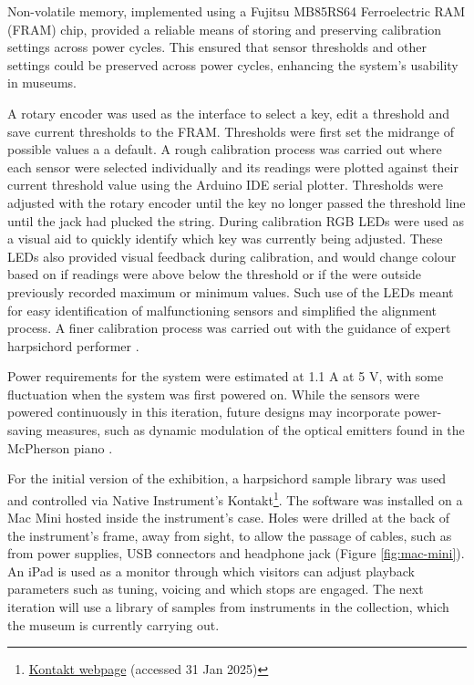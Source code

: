 Non-volatile memory, implemented using a Fujitsu MB85RS64 Ferroelectric RAM (FRAM) chip, provided a reliable means of storing and preserving calibration settings across power cycles. This ensured that sensor thresholds and other settings could be preserved across power cycles, enhancing the system's usability in museums.  

A rotary encoder was used as the interface to select a key, edit a threshold and save current thresholds to the FRAM.
Thresholds were first set the midrange of possible values a a default. A rough calibration process was carried out where each sensor were selected individually and its readings were plotted against their current threshold value using the Arduino IDE serial plotter. Thresholds were adjusted with the rotary encoder until the key no longer passed the threshold line until the jack had plucked the string. During calibration RGB LEDs were used as a visual aid to quickly identify which key was currently being adjusted. These LEDs also provided visual feedback during calibration, and would change colour based on if readings were above below the threshold or if the were outside previously recorded maximum or minimum values. Such use of the LEDs meant for easy identification of malfunctioning sensors and simplified the alignment process. A finer calibration process was carried out with the guidance of expert harpsichord performer .

Power requirements for the system were estimated at 1.1 A at 5 V, with some fluctuation when the system was first powered on. While the sensors were powered continuously in this iteration, future designs may incorporate power-saving measures, such as dynamic modulation of the optical emitters found in the McPherson piano \cite{McPherson2013}.

For the initial version of the exhibition, a harpsichord sample library was used and controlled via Native Instrument's Kontakt\footnote{\href{https://www.native-instruments.com/en/products/komplete/samplers/kontakt-8/?srsltid=AfmBOorKUf43SoIxGBS2-GnXmKHHkgcfcfWRskpweDhLSG3FiF0qrf2w}{Kontakt webpage} (accessed 31 Jan 2025)}. The software was installed on a Mac Mini hosted inside the instrument's case. Holes were drilled at the back of the instrument's frame, away from sight, to allow the passage of cables, such as from power supplies, USB connectors and headphone jack (Figure \ref{fig:mac-mini}). 
An iPad is used as a monitor through which visitors can adjust playback parameters such as tuning, voicing and which stops are engaged. The next iteration will use a library of samples from instruments in the collection, which the museum is currently carrying out.



